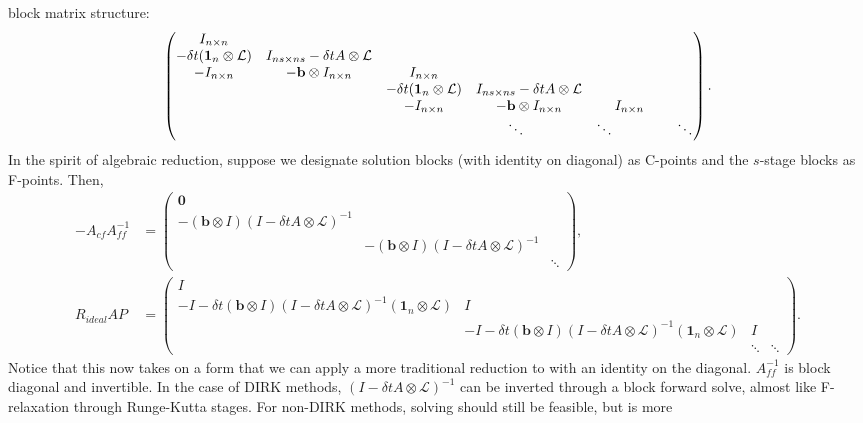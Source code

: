 \documentclass[a4paper,12pt]{article}
\begin{document}
block matrix structure:
%
\begin{align*}
\begin{pmatrix}
I_{n\times n} &  \\
-\delta t(\mathbf{1}_n \otimes \mathcal{L}) & I_{ns\times ns} - \delta t A\otimes \mathcal{L} &\\
-I_{n\times n} & -\mathbf{b}\otimes I_{n\times n} & I_{n\times n} \\ 
& & -\delta t(\mathbf{1}_n \otimes \mathcal{L}) & I_{ns\times ns} - \delta t A\otimes \mathcal{L} &  \\
& & -I_{n\times n} & -\mathbf{b}\otimes I_{n\times n} & I_{n\times n} \\
&&& \ddots\text{\hspace{4ex}}  & \ddots\text{\hspace{8ex}}  & \ddots
\end{pmatrix}.
\end{align*}
%
In the spirit of algebraic reduction, suppose we designate solution blocks (with identity on diagonal) as C-points and
the $s$-stage blocks as F-points. Then,
%
{\footnotesize
\begin{align}
-A_{cf}A_{ff}^{-1} & = \begin{pmatrix} \mathbf{0} \\ -(\mathbf{b}\otimes I )(I - \delta tA\otimes \mathcal{L})^{-1} \\
&  -(\mathbf{b}\otimes I) (I - \delta tA\otimes \mathcal{L})^{-1} \\ & & \ddots \end{pmatrix} , \label{eq:acfaff}\\
R_{ideal}AP & =  \begin{pmatrix} I \\ -I -\delta t(\mathbf{b}\otimes I )(I - \delta tA\otimes \mathcal{L})^{-1}(\mathbf{1}_n \otimes \mathcal{L})  & I \\
& -I - \delta t(\mathbf{b}\otimes I )(I - \delta tA\otimes \mathcal{L})^{-1}(\mathbf{1}_n \otimes \mathcal{L})  & I \\ & & \ddots & \ddots \end{pmatrix}.\label{eq:rap}
\end{align}
%
}Notice that this now takes on a form that we can apply a more traditional reduction to with an identity on the diagonal. $A_{ff}^{-1}$ is
block diagonal and invertible. In the case of DIRK methods, $ (I - \delta tA\otimes \mathcal{L})^{-1} $ can be inverted through a block
forward solve, almost like F-relaxation through Runge-Kutta stages. For non-DIRK methods, solving should still be feasible, but is more
\end{document}
